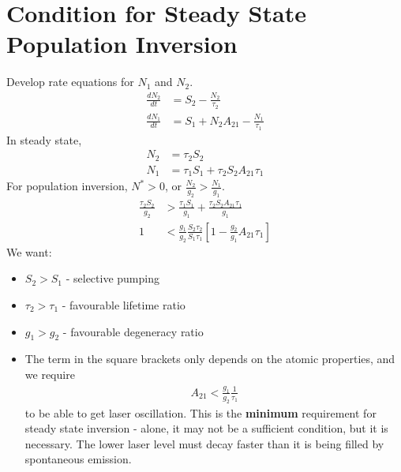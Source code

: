 \documentclass[a4paper, 11pt, normalem]{report}
\begin{document}
\section{Condition for Steady State Population Inversion}
\begin{figure}[H]
    \centering
    \vspace{-25pt}
\end{figure}
Develop rate equations for $N_1$ and $N_2$.
\begin{align}
    \frac{dN_2}{dt} &= S_2 - \frac{N_2}{\tau_2} \\
    \frac{dN_1}{dt} &= S_1 + N_2A_{21} - \frac{N_1}{\tau_1}
\end{align}
In steady state,
\begin{align}
    N_2 &= \tau_2S_2 \\
    N_1 &= \tau_1S_1 + \tau_2S_2A_{21}\tau_1
\end{align}
For population inversion, $N^* > 0$, or $\frac{N_2}{g_2} > \frac{N_1}{g_1}$.
\begin{align}
    \frac{\tau_2S_2}{g_2} &> \frac{\tau_1S_1}{g_1} + \frac{\tau_2S_2A_{21}\tau_1}{g_1} \\
    1 &< \frac{g_1}{g_2}\frac{S_2\tau_2}{S_1\tau_1}\left[1-\frac{g_2}{g_1}A_{21}\tau_1\right]
\end{align}
We want:
\begin{itemize}
    \item $S_2 > S_1$ - selective pumping
    \item $\tau_2 > \tau_1$ - favourable lifetime ratio
    \item $g_1 > g_2$ - favourable degeneracy ratio
    \item The term in the square brackets only depends on the atomic properties, and we require
        \begin{align}
            A_{21} < \frac{g_1}{g_2}\frac{1}{\tau_1}
        \end{align}
        to be able to get laser oscillation.
        This is the \textbf{minimum} requirement for steady state inversion - alone, it may not be a sufficient condition, but it is necessary.
        The lower laser level must decay faster than it is being filled by spontaneous emission.
\end{itemize}
\end{document}
